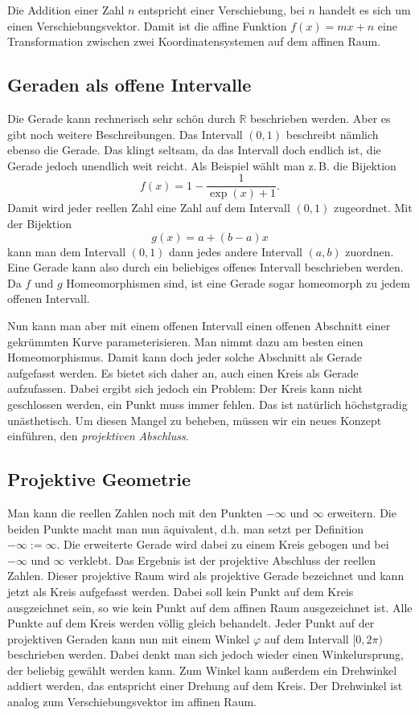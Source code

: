 \documentclass[a4paper,11pt,fleqn,twocolumn,twoside]{article}
\newcommand{\R}{\mathbb R}
\begin{document}
Die Addition einer Zahl $n$ entspricht einer Verschiebung,
bei $n$ handelt es sich um einen Verschiebungsvektor. Damit ist
die affine Funktion $f(x)=mx+n$ eine Transformation zwischen zwei
Koordinatensystemen auf dem affinen Raum.

\subsection{Geraden als offene Intervalle}
Die Gerade kann rechnerisch sehr schön durch $\R$ beschrieben
werden. Aber es gibt noch weitere Beschreibungen. Das Intervall
$(0,1)$ beschreibt nämlich ebenso die Gerade. Das klingt seltsam,
da das Intervall doch endlich ist, die Gerade jedoch unendlich weit
reicht. Als Beispiel wählt man z.\,B. die Bijektion
\begin{equation}
f(x) = 1-\frac{1}{\exp(x)+1}.
\end{equation}
Damit wird jeder reellen Zahl eine Zahl auf dem Intervall $(0,1)$
zugeordnet. Mit der Bijektion
\begin{equation}
g(x) = a+(b-a)x
\end{equation}
kann man dem Intervall $(0,1)$ dann jedes andere Intervall
$(a,b)$ zuordnen. Eine Gerade kann also durch ein beliebiges offenes
Intervall beschrieben werden. Da $f$ und $g$ Homeomorphismen sind,
ist eine Gerade sogar homeomorph zu jedem offenen Intervall.

Nun kann man aber mit einem offenen Intervall einen offenen Abschnitt
einer gekrümmten Kurve parameterisieren. Man nimmt dazu am besten
einen Homeomorphismus. Damit kann doch jeder solche Abschnitt als
Gerade aufgefasst werden. Es bietet sich daher an, auch einen Kreis
als Gerade aufzufassen. Dabei ergibt sich jedoch ein Problem: Der
Kreis kann nicht geschlossen werden, ein Punkt muss immer fehlen.
Das ist natürlich höchstgradig unästhetisch. Um diesen Mangel zu
beheben, müssen wir ein neues Konzept einführen, den
\textit{projektiven Abschluss}.

\subsection{Projektive Geometrie}

Man kann die reellen Zahlen noch mit den Punkten $-\infty$
und $\infty$ erweitern. Die beiden Punkte macht man nun äquivalent,
d.h. man setzt per Definition $-\infty:=\infty$. Die erweiterte
Gerade wird dabei zu einem Kreis gebogen und bei $-\infty$ und
$\infty$ verklebt. Das Ergebnis ist der projektive Abschluss der
reellen Zahlen. Dieser projektive Raum wird als projektive Gerade
bezeichnet und kann jetzt als Kreis aufgefasst werden. Dabei soll
kein Punkt auf dem Kreis ausgzeichnet sein, so wie kein Punkt auf
dem affinen Raum ausgezeichnet ist. Alle Punkte auf dem Kreis werden
völlig gleich behandelt. Jeder Punkt auf der projektiven Geraden kann
nun mit einem Winkel $\varphi$ auf dem Intervall $[0,2\pi)$
beschrieben werden. Dabei denkt man sich jedoch wieder einen
Winkelursprung, der beliebig gewählt werden kann. Zum Winkel kann
außerdem ein Drehwinkel addiert werden, das entspricht einer Drehung
auf dem Kreis. Der Drehwinkel ist analog zum Verschiebungsvektor im
affinen Raum.
\end{document}
